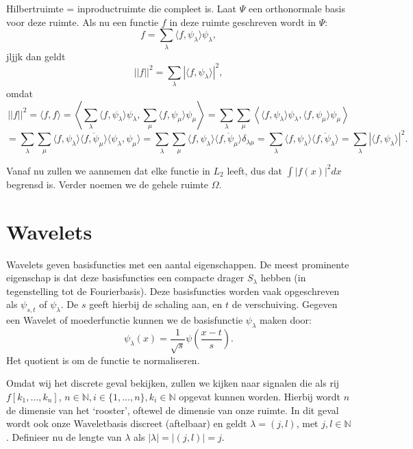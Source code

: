 \documentclass[11pt]{amsart}
\theoremstyle{definition}
\newcommand{\N}{\mathbb{N}}
\begin{document}
\title{}
\author{Jan Westerdiep}
\maketitle


Hilbertruimte = inproductruimte die compleet is. Laat $\Psi$ een orthonormale basis voor deze ruimte. Als nu een functie $f$ in deze ruimte geschreven wordt in $\Psi$:
\[
f = \sum_{\lambda} \langle f, \psi_\lambda \rangle \psi_\lambda,
\]jljjk
dan geldt
\[
||f||^2 = \sum_{\lambda} | \langle f, \psi_\lambda \rangle |^2,
\]
omdat
\[
||f||^2 = \langle f, f \rangle = \left\langle \sum_{\lambda} \langle f, \psi_\lambda \rangle \psi_\lambda, \sum_{\mu} \langle f, \psi_\mu \rangle \psi_\mu \right\rangle = \sum_{\lambda} \sum_{\mu} \left\langle \langle f, \psi_\lambda \rangle \psi_\lambda, \langle f, \psi_\mu \rangle \psi_\mu \right \rangle
\]
\[
 = \sum_\lambda \sum_\mu \langle f, \psi_\lambda \rangle \overline{\langle f, \psi_\mu \rangle}\langle \psi_\lambda, \psi_\mu \rangle = \sum_\lambda \sum_\mu \langle f, \psi_\lambda \rangle \overline{\langle f, \psi_\mu \rangle} \delta_{\lambda \mu} = \sum_\lambda \langle f, \psi_\lambda \rangle \overline{\langle f, \psi_\lambda \rangle} = \sum_\lambda |\langle f, \psi_\lambda \rangle |^2.
\]

Vanaf nu zullen we aannemen dat elke functie in $L_2$ leeft, dus dat $\int |f(x)|^2 dx$ begrensd is. Verder noemen we de gehele ruimte $\Omega$.

\section{Wavelets}
Wavelets geven basisfuncties met een aantal eigenschappen. De meest prominente eigenschap is dat deze basisfuncties een compacte drager $S_\lambda$ hebben (in tegenstelling tot de Fourierbasis). Deze basisfuncties worden vaak opgeschreven als $\psi_{s,t}$ of $\psi_\lambda$. De $s$ geeft hierbij de schaling aan, en $t$ de verschuiving. Gegeven een Wavelet of moederfunctie kunnen we de basisfunctie $\psi_\lambda$ maken door:
\[
	\psi_\lambda(x) = \frac{1}{\sqrt{s}}\psi\left(\frac{x-t}{s}\right).
\]
Het quotient is om de functie te normaliseren.

Omdat wij het discrete geval bekijken, zullen we kijken naar signalen die als rij $f[k_1,\ldots,k_n]$, $n \in \N, i \in \{ 1, \ldots, n \}, k_i \in \N$ opgevat kunnen worden. Hierbij wordt $n$ de dimensie van het `rooster', oftewel de dimensie van onze ruimte. In dit geval wordt ook onze Waveletbasis discreet (aftelbaar) en geldt $\lambda = (j,l)$, met $j,l \in \N$.  Definieer nu de lengte van $\lambda$ als $|\lambda| = |(j,l)| = j$.
\end{document}
